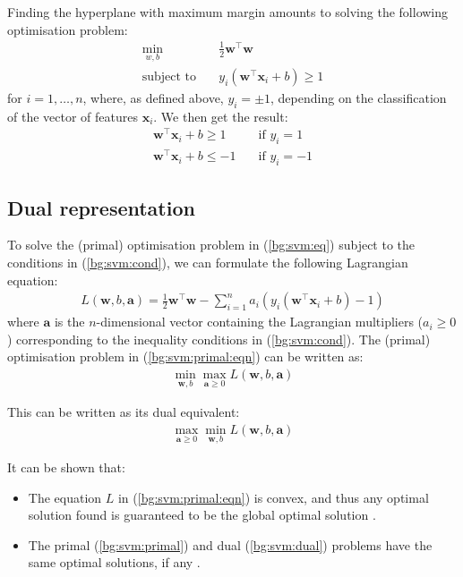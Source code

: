 \documentclass[12pt, twoside, a4paper]{report}
\def\vec{\boldsymbol}
\begin{document}
Finding the hyperplane with maximum margin amounts to solving the following optimisation problem:
\begin{align}
\min_{w, b} \quad &\frac{1}{2} \boldsymbol w^\top \boldsymbol w \label{bg:svm:eq} \\
\text{subject to} \quad & y_i(\boldsymbol w^\top \boldsymbol x_i + b) \geq 1 \label{bg:svm:cond} 
\end{align}
for $i = 1, \dots , n$, where, as defined above, $y_i = \pm 1$, depending on the classification of the vector of features $\boldsymbol x_i$. We then get the result:
\begin{align*}
\boldsymbol w^\top \boldsymbol x_i + b \geq 1 \quad &\text{if $y_i = 1$} \\
\boldsymbol w^\top \boldsymbol x_i + b \leq -1 \quad &\text{if $y_i = -1$}
\end{align*}


\subsection{Dual representation}
To solve the (primal) optimisation problem in (\ref{bg:svm:eq}) subject to the conditions in (\ref{bg:svm:cond}), we can formulate the following Lagrangian equation:
\begin{align}
L(\boldsymbol w, b, \boldsymbol a)
= \frac{1}{2} \boldsymbol w^\top \boldsymbol w - \sum_{i=1}^n a_i (y_i(\boldsymbol w^\top \boldsymbol x_i + b) - 1) \label{bg:svm:primal:eqn}
\end{align}
where $\boldsymbol a$ is the $n$-dimensional vector containing the Lagrangian multipliers ($a_i \geq 0$) corresponding to the inequality conditions in (\ref{bg:svm:cond}). The (primal) optimisation problem in (\ref{bg:svm:primal:eqn}) can be written as:
\begin{align}
\min_{\boldsymbol w, b} \max_{\boldsymbol a \geq 0} L(\boldsymbol w, b, \vec a) \label{bg:svm:primal}
\end{align}

This can be written as its dual equivalent:
\begin{align}
\max_{\vec a \geq 0} \min_{\vec w, b} L(\vec w, b, \vec a) \label{bg:svm:dual}
\end{align}

It can be shown that:
\begin{itemize}
\item The equation $L$ in (\ref{bg:svm:primal:eqn}) is convex, and thus any optimal solution found is guaranteed to be the global optimal solution \cite{RefWorks:123}.
\item The primal (\ref{bg:svm:primal}) and dual (\ref{bg:svm:dual}) problems have the same optimal solutions, if any \cite{RefWorks:124}.
\end{itemize}
\end{document}
